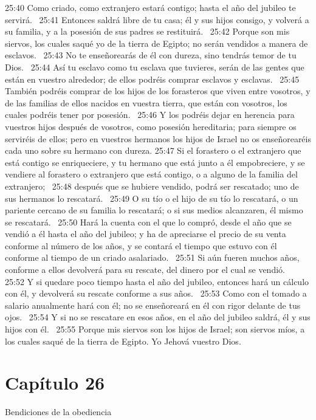 25:40 Como criado, como extranjero estará contigo; hasta el año del jubileo te servirá.  
25:41 Entonces saldrá libre de tu casa; él y sus hijos consigo, y volverá a su familia, y a la posesión de sus padres se restituirá.  
25:42 Porque son mis siervos, los cuales saqué yo de la tierra de Egipto; no serán vendidos a manera de esclavos.  
25:43 No te enseñorearás de él con dureza, sino tendrás temor de tu Dios.  
25:44 Así tu esclavo como tu esclava que tuvieres, serán de las gentes que están en vuestro alrededor; de ellos podréis comprar esclavos y esclavas.  
25:45 También podréis comprar de los hijos de los forasteros que viven entre vosotros, y de las familias de ellos nacidos en vuestra tierra, que están con vosotros, los cuales podréis tener por posesión.  
25:46 Y los podréis dejar en herencia para vuestros hijos después de vosotros, como posesión hereditaria; para siempre os serviréis de ellos; pero en vuestros hermanos los hijos de Israel no os enseñorearéis cada uno sobre su hermano con dureza. 
25:47 Si el forastero o el extranjero que está contigo se enriqueciere, y tu hermano que está junto a él empobreciere, y se vendiere al forastero o extranjero que está contigo, o a alguno de la familia del extranjero;  
25:48 después que se hubiere vendido, podrá ser rescatado; uno de sus hermanos lo rescatará.  
25:49 O su tío o el hijo de su tío lo rescatará, o un pariente cercano de su familia lo rescatará; o si sus medios alcanzaren, él mismo se rescatará.  
25:50 Hará la cuenta con el que lo compró, desde el año que se vendió a él hasta el año del jubileo; y ha de apreciarse el precio de su venta conforme al número de los años, y se contará el tiempo que estuvo con él conforme al tiempo de un criado asalariado.  
25:51 Si aún fueren muchos años, conforme a ellos devolverá para su rescate, del dinero por el cual se vendió.  
25:52 Y si quedare poco tiempo hasta el año del jubileo, entonces hará un cálculo con él, y devolverá su rescate conforme a sus años.  
25:53 Como con el tomado a salario anualmente hará con él; no se enseñoreará en él con rigor delante de tus ojos.  
25:54 Y si no se rescatare en esos años, en el año del jubileo saldrá, él y sus hijos con él.  
25:55 Porque mis siervos son los hijos de Israel; son siervos míos, a los cuales saqué de la tierra de Egipto. Yo Jehová vuestro Dios.  
\section*{Capítulo 26}
Bendiciones de la obediencia   

